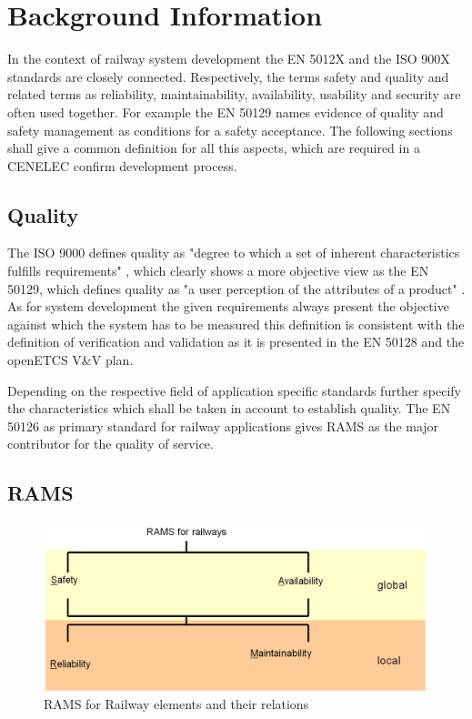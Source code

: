 \documentclass{template/openetcs_report}
\begin{document}
\section{Background Information}
\label{sec:Background}

In the context of railway system development the EN 5012X and the ISO 900X standards are closely connected. Respectively, the terms safety and quality and related terms as reliability, maintainability, availability, usability and security are often used together. For example the EN 50129 names evidence of quality and safety management as conditions for a safety acceptance. The following sections shall give a common definition for all this aspects, which are required in a CENELEC confirm development process. 

\subsection{Quality}

The ISO 9000 defines quality as "degree to which a set of inherent characteristics fulfills requirements" \cite{ISO9000}, which clearly shows a more objective view as the EN 50129, which defines quality as "a user perception of the attributes of a product" \cite{EN50129}. As for system development the given requirements always present the objective against which the system has to be measured this definition is consistent with the definition of verification and validation as it is presented in the EN 50128 and the openETCS V\&V plan.

Depending on the respective field of application specific standards further specify the characteristics which shall be taken in account to establish quality. The EN 50126 as primary standard for railway applications gives RAMS as the major contributor for the quality of service. 

\subsection{RAMS}



\begin{figure}[htbp]
\centering
\includegraphics[width=0.7\linewidth]{images/bld_RAMS-Railway-50126}
\caption{RAMS for Railway elements and their relations \cite{Schnieder.2013}}
\label{fig:RAMS-EN50126}
\end{figure}
\end{document}
